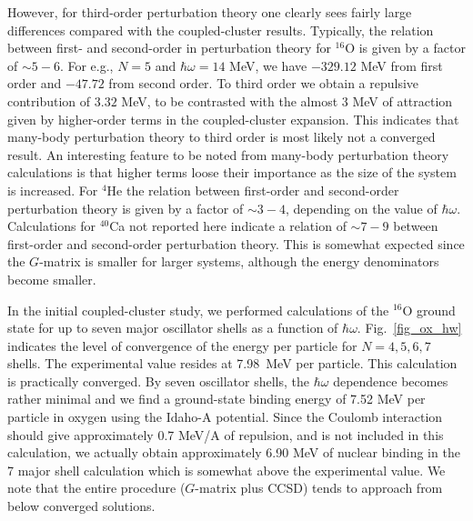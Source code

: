 \documentclass{article}
\begin{document}
However, for third-order perturbation theory one clearly sees fairly large
differences compared with the coupled-cluster results.
Typically, the relation between first- and second-order in perturbation theory
for  $^{16}$O is given by a factor of $\sim 5-6$. For e.g., $N=5$ and
$\hbar\omega=14$ MeV, we have $-329.12$ MeV from first order and $-47.72$
from second order. To third order we obtain a repulsive contribution of
$3.32$ MeV, to be contrasted with the almost $3$ MeV of attraction given
by higher-order terms in the coupled-cluster expansion. This indicates that
many-body perturbation theory to third order is
most likely not a converged result. An interesting feature to be noted from
many-body perturbation theory calculations is that higher terms loose their
importance as the size of the system is increased. For
$^{4}$He the relation between first-order and second-order perturbation theory
is given by a factor of $\sim 3-4$, depending on the value of $\hbar\omega$.
Calculations for $^{40}$Ca not reported here indicate a relation of
$\sim 7-9$ between first-order and second-order perturbation theory.
This is somewhat expected since the $G$-matrix is smaller for larger
systems, although the energy denominators become smaller.

In the initial coupled-cluster study, we performed calculations of 
the $^{16}$O ground state for up to seven major oscillator 
shells as a function of $\hbar\omega$. 
Fig.~\ref{fig_ox_hw} indicates the level of convergence
of the energy per particle for $N=4,5,6,7$ shells. The experimental value
resides at 7.98~MeV per particle.  This calculation is practically converged.
By seven oscillator shells, the $\hbar\omega$ dependence becomes rather
minimal and we find a ground-state binding energy of 7.52 MeV per particle in
oxygen using the Idaho-A potential. Since the Coulomb interaction should give
approximately 0.7 MeV/A of repulsion, and is not included in this
calculation, we actually obtain approximately 6.90 MeV of nuclear binding
in the 7 major shell calculation which is somewhat above the experimental
value. We note that the entire procedure ($G$-matrix plus CCSD) tends to
approach from below converged solutions.
\end{document}

